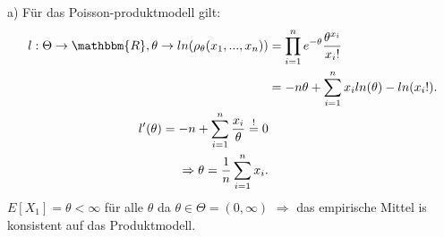 \documentclass[draft]{article}
\begin{document}
\newpage

a) Für das Poisson-produktmodell gilt: 
\begin{align*}
    l : \Theta \rightarrow \mathbbm{R} , \theta \rightarrow ln(\rho_\theta(x_1,...,x_n)) & = \prod\limits_{i=1}^{n} e^{-\theta} \frac{\theta^{x_i}}{x_i !} \\
    & = -n\theta + \sum\limits_{i=1}^{n}x_i ln(\theta) - ln(x_i !) . \\
    l'(\theta) = -n + \sum\limits_{i=1}^{n} \frac{x_i}{\theta} \overset{!}{=} 0 \\
    \Rightarrow \theta = \frac{1}{n}\sum\limits_{i=1}^{n}x_i . \\
\end{align*}
$E[X_1]=\theta<\infty$ für alle $\theta$ da $\theta\in\Theta=(0, \infty)$ \newline
$\Rightarrow$ das empirische Mittel is konsistent auf das Produktmodell. 
\end{document}
